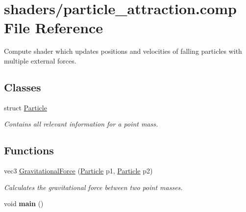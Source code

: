 \hypertarget{particle__attraction_8comp}{}\section{shaders/particle\+\_\+attraction.comp File Reference}
\label{particle__attraction_8comp}


Compute shader which updates positions and velocities of falling particles with multiple external forces.  


\subsection*{Classes}
\begin{DoxyCompactItemize}
\item 
struct \hyperlink{struct_particle}{Particle}
\begin{DoxyCompactList}\small\item\em Contains all relevant information for a point mass. \end{DoxyCompactList}\end{DoxyCompactItemize}
\subsection*{Functions}
\begin{DoxyCompactItemize}
\item 
vec3 \hyperlink{particle__attraction_8comp_a84b4523a839013a4b2c2c9041697be0f}{Gravitational\+Force} (\hyperlink{struct_particle}{Particle} p1, \hyperlink{struct_particle}{Particle} p2)
\begin{DoxyCompactList}\small\item\em Calculates the gravitational force between two point masses. \end{DoxyCompactList}\item 
\mbox{\label{particle__attraction_8comp_acdef7a1fd863a6d3770c1268cb06add3}} 
void {\bfseries main} ()
\end{DoxyCompactItemize}

